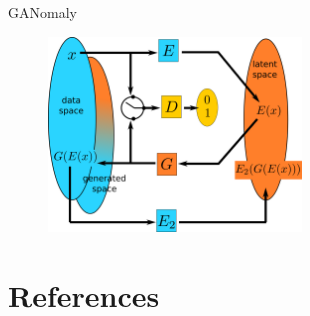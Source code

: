 \documentclass[xcolor=pdftex,dvipsnames,table,mathserif]{beamer}
\begin{document}
\begin{frame}{GANomaly \cite{akcay_ganomaly:_2019}}

  \begin{figure}[ht]
    \centering
    \includegraphics[width=0.6\textwidth]{ganomaly}
  \end{figure}



\end{frame}





\section*{References}


\end{document}

